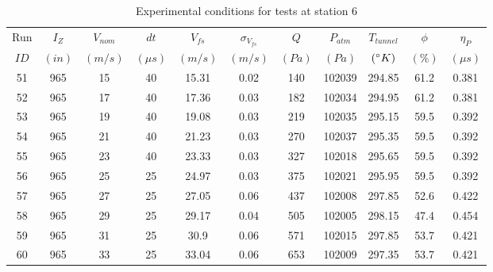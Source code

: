 \begin{table}[H]
\begin{center}
\begin{tabular}{|ccccccccccc|}
	\hline
	Run & $I_Z$ & $V_{nom}$ & $dt$ & $V_{fs}$ & $\sigma_{V_{fs}}$ & $Q$ & $P_{atm}$ & $T_{tunnel}$ & $\phi$ & $\eta_P$\\
	$ID$ & $(in)$ & $(m/s)$ & $(\mu s)$ & $(m/s)$ & $(m/s)$ & $(Pa)$ & $(Pa)$ & $(\degree K)$ & $(\%)$ & $(\mu s)$\\
	\hline
	51 & 965 & 15 & 40 & 15.31 & 0.02 & 140 & 102039 & 294.85 & 61.2 & 0.381\\
	52 & 965 & 17 & 40 & 17.36 & 0.03 & 182 & 102034 & 294.95 & 61.2 & 0.381\\
	53 & 965 & 19 & 40 & 19.08 & 0.03 & 219 & 102035 & 295.15 & 59.5 & 0.392\\
	54 & 965 & 21 & 40 & 21.23 & 0.03 & 270 & 102037 & 295.35 & 59.5 & 0.392\\
	55 & 965 & 23 & 40 & 23.33 & 0.03 & 327 & 102018 & 295.65 & 59.5 & 0.392\\
	56 & 965 & 25 & 25 & 24.97 & 0.03 & 375 & 102021 & 295.95 & 59.5 & 0.392\\
	57 & 965 & 27 & 25 & 27.05 & 0.06 & 437 & 102008 & 297.85 & 52.6 & 0.422\\
	58 & 965 & 29 & 25 & 29.17 & 0.04 & 505 & 102005 & 298.15 & 47.4 & 0.454\\
	59 & 965 & 31 & 25 & 30.9 & 0.06 & 571 & 102015 & 297.85 & 53.7 & 0.421\\
	60 & 965 & 33 & 25 & 33.04 & 0.06 & 653 & 102009 & 297.35 & 53.7 & 0.421\\
	\hline
\end{tabular}
\caption{Experimental conditions for tests at station 6}
\label{table:station_6_measurements}
\end{center}
\end{table}
